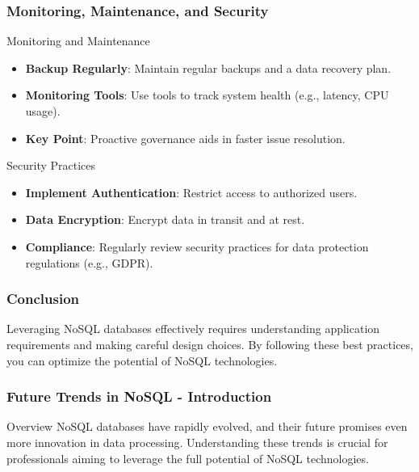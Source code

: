 \documentclass[aspectratio=169]{beamer}
\begin{document}
\begin{frame}[fragile]
    \frametitle{Monitoring, Maintenance, and Security}
    \begin{block}{Monitoring and Maintenance}
        \begin{itemize}
            \item \textbf{Backup Regularly}: Maintain regular backups and a data recovery plan.
            \item \textbf{Monitoring Tools}: Use tools to track system health (e.g., latency, CPU usage).
            \item \textbf{Key Point}: Proactive governance aids in faster issue resolution.
        \end{itemize}
    \end{block}

    \begin{block}{Security Practices}
        \begin{itemize}
            \item \textbf{Implement Authentication}: Restrict access to authorized users.
            \item \textbf{Data Encryption}: Encrypt data in transit and at rest.
            \item \textbf{Compliance}: Regularly review security practices for data protection regulations (e.g., GDPR).
        \end{itemize}
    \end{block}
\end{frame}

\begin{frame}[fragile]
    \frametitle{Conclusion}
    Leveraging NoSQL databases effectively requires understanding application requirements and making careful design choices. By following these best practices, you can optimize the potential of NoSQL technologies.
\end{frame}

\begin{frame}[fragile]
    \frametitle{Future Trends in NoSQL - Introduction}
    \begin{block}{Overview}
        NoSQL databases have rapidly evolved, and their future promises even more innovation in data processing. Understanding these trends is crucial for professionals aiming to leverage the full potential of NoSQL technologies.
    \end{block}
\end{frame}
\end{document}
